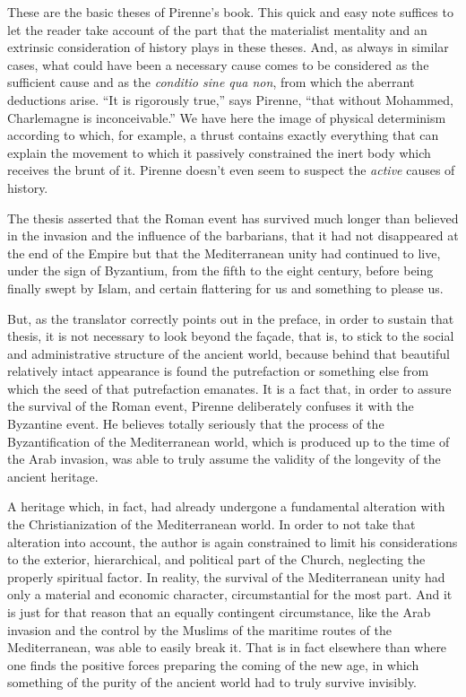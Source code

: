 These are the basic theses of Pirenne's book. This quick and easy note suffices to let the reader take account of the part that the materialist mentality and an extrinsic consideration of history plays in these theses. And, as always in similar cases, what could have been a necessary cause comes to be considered as the sufficient cause and as the \emph{conditio sine qua non}, from which the aberrant deductions arise. ``It is rigorously true,'' says Pirenne, ``that without Mohammed, Charlemagne is inconceivable.'' We have here the image of physical determinism according to which, for example, a thrust contains exactly everything that can explain the movement to which it passively constrained the inert body which receives the brunt of it. Pirenne doesn't even seem to suspect the \emph{active} causes of history.

The thesis asserted that the Roman event has survived much longer than believed in the invasion and the influence of the barbarians, that it had not disappeared at the end of the Empire but that the Mediterranean unity had continued to live, under the sign of Byzantium, from the fifth to the eight century, before being finally swept by Islam, and certain flattering for us and something to please us.

But, as the translator correctly points out in the preface, in order to sustain that thesis, it is not necessary to look beyond the façade, that is, to stick to the social and administrative structure of the ancient world, because behind that beautiful relatively intact appearance is found the putrefaction or something else from which the seed of that putrefaction emanates. It is a fact that, in order to assure the survival of the Roman event, Pirenne deliberately confuses it with the Byzantine event. He believes totally seriously that the process of the Byzantification of the Mediterranean world, which is produced up to the time of the Arab invasion, was able to truly assume the validity of the longevity of the ancient heritage.

A heritage which, in fact, had already undergone a fundamental alteration with the Christianization of the Mediterranean world. In order to not take that alteration into account, the author is again constrained to limit his considerations to the exterior, hierarchical, and political part of the Church, neglecting the properly spiritual factor. In reality, the survival of the Mediterranean unity had only a material and economic character, circumstantial for the most part. And it is just for that reason that an equally contingent circumstance, like the Arab invasion and the control by the Muslims of the maritime routes of the Mediterranean, was able to easily break it. That is in fact elsewhere than where one finds the positive forces preparing the coming of the new age, in which something of the purity of the ancient world had to truly survive invisibly.

